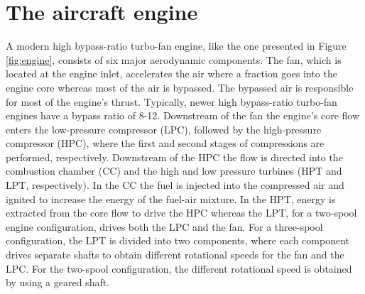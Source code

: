\section{The aircraft engine\label{ch:engine}}
A modern high bypass-ratio turbo-fan engine, like the one presented in Figure \ref{fig:engine}, consists of six major aerodynamic components. The fan, which is located at the engine inlet, accelerates the air where a fraction goes into the engine core whereas most of the air is bypassed. The bypassed air is responsible for most of the engine's thrust. Typically, newer high bypass-ratio turbo-fan engines have a bypass ratio of 8-12. Downstream of the fan the engine's core flow enters the low-pressure compressor (LPC), followed by the high-pressure compressor (HPC), where the first and second stages of compressions are performed, respectively. Downstream of the HPC the flow is directed into the combustion chamber (CC) and the high and low pressure turbines (HPT and LPT, respectively). In the CC the fuel is injected into the compressed air and ignited to increase the energy of the fuel-air mixture. In the HPT, energy is extracted from the core flow to drive the HPC whereas the LPT, for a two-spool engine configuration, drives both the LPC and the fan. For a three-spool configuration, the LPT is divided into two components, where each component drives separate shafts to obtain different rotational speeds for the fan and the LPC. For the two-spool configuration, the different rotational speed is obtained by using a geared shaft.

